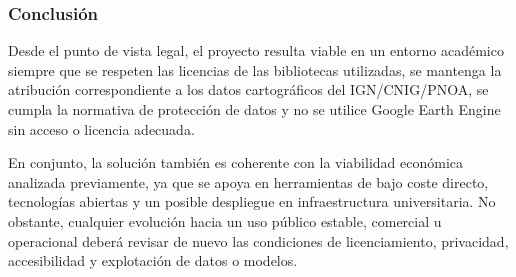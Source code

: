 \subsubsection{Conclusión}

Desde el punto de vista legal, el proyecto resulta viable en un entorno académico siempre que se respeten las licencias de las bibliotecas utilizadas, se mantenga la atribución correspondiente a los datos cartográficos del IGN/CNIG/PNOA, se cumpla la normativa de protección de datos y no se utilice Google Earth Engine sin acceso o licencia adecuada.

En conjunto, la solución también es coherente con la viabilidad económica analizada previamente, ya que se apoya en herramientas de bajo coste directo, tecnologías abiertas y un posible despliegue en infraestructura universitaria. No obstante, cualquier evolución hacia un uso público estable, comercial u operacional deberá revisar de nuevo las condiciones de licenciamiento, privacidad, accesibilidad y explotación de datos o modelos.




